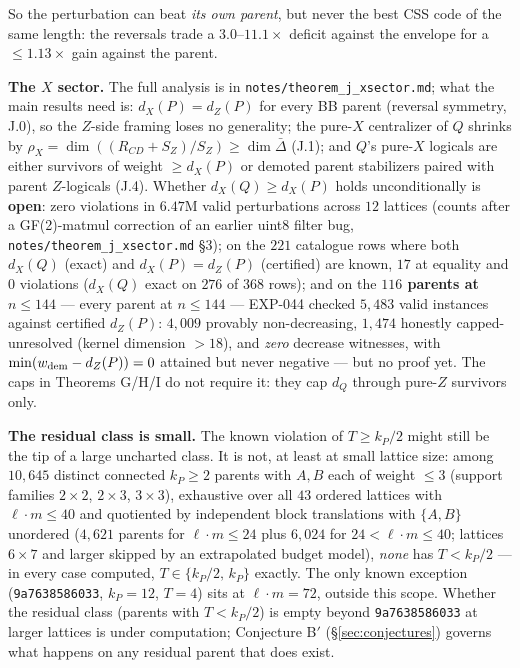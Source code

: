 \documentclass[11pt]{article}
\theoremstyle{plain}
\theoremstyle{remark}
\begin{document}
So the perturbation can beat \emph{its own parent}, but never the best CSS code of the same
length: the reversals trade a $3.0$--$11.1\times$ deficit against the envelope for a $\le 1.13\times$
gain against the parent.

\textbf{The $X$ sector.} The full analysis is in \texttt{notes/theorem\_j\_xsector.md};
what the main results need is: $d_X(P)=d_Z(P)$ for every BB parent (reversal symmetry,
J.0), so the $Z$-side framing loses no generality; the pure-$X$ centralizer of $Q$ shrinks
by $\rho_X=\dim((R_{CD}+S_Z)/S_Z)\ge\dim\bar\Delta$ (J.1); and $Q$'s pure-$X$
logicals are either survivors of weight $\ge d_X(P)$ or demoted parent stabilizers paired
with parent $Z$-logicals (J.4). Whether $d_X(Q)\ge d_X(P)$ holds unconditionally is
\textbf{open}: zero violations in $6.47$M valid perturbations across $12$ lattices (counts
after a GF(2)-matmul correction of an earlier uint8 filter bug,
\texttt{notes/theorem\_j\_xsector.md} \S3); on the $221$ catalogue rows where both $d_X(Q)$
(exact) and $d_X(P)=d_Z(P)$ (certified) are known, $17$ at equality and $0$ violations
($d_X(Q)$ exact on $276$ of $368$ rows); and on the \textbf{$116$ parents at $n\le144$}
--- every parent at $n\le144$ --- EXP-044 checked $5{,}483$ valid instances against
certified $d_Z(P)$: $4{,}009$ provably non-decreasing, $1{,}474$ honestly
capped-unresolved (kernel dimension $>18$), and \emph{zero} decrease witnesses, with
$\min(w_{\rm dem}-d_Z(P))=0$ attained but never negative --- but no proof yet.
The caps in Theorems G/H/I do not require it:
they cap $d_Q$ through pure-$Z$ survivors only.

\textbf{The residual class is small.} The known violation of $T\ge k_P/2$ might still
be the tip of a large uncharted class. It is not, at least at small lattice size: among
$10{,}645$ distinct connected $k_P\ge2$ parents with $A,B$ each of weight $\le3$
(support families $2{\times}2$, $2{\times}3$, $3{\times}3$), exhaustive over all $43$
ordered lattices with $\ell\cdot m\le 40$ and quotiented by independent block
translations with $\{A,B\}$ unordered ($4{,}621$ parents for $\ell\cdot m\le24$ plus
$6{,}024$ for $24<\ell\cdot m\le40$; lattices $6{\times}7$ and larger skipped by an
extrapolated budget model), \emph{none} has
$T<k_P/2$ --- in every case computed, $T\in\{k_P/2,\,k_P\}$ exactly. The only known
exception (\texttt{9a7638586033}, $k_P{=}12$, $T{=}4$) sits at
$\ell\cdot m=72$, outside this scope. Whether the residual class (parents with
$T<k_P/2$) is empty beyond \texttt{9a7638586033} at larger lattices is under
computation; Conjecture B$'$ (\S\ref{sec:conjectures}) governs what happens on any
residual parent that does exist.
\end{document}
